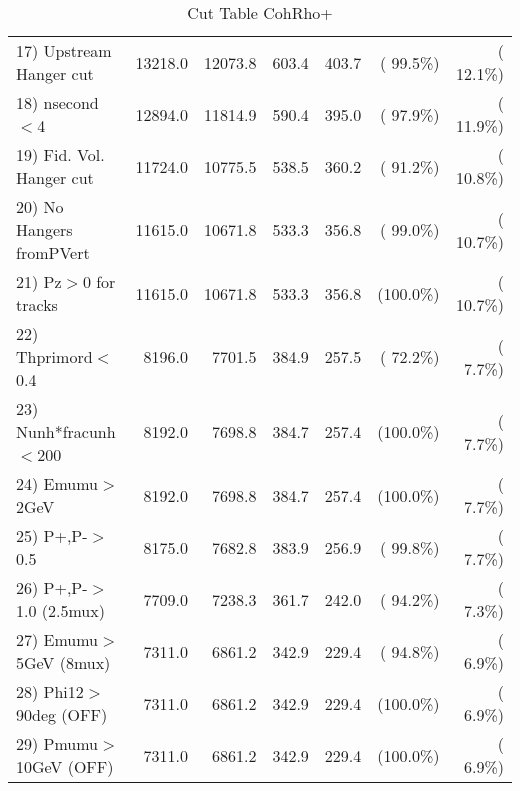 \begin{table}[h!]
\begin{tabular}{||l||r|r|r|r|r|r||}
 17) Upstream Hanger cut  &      13218.0 &      12073.8 &        603.4 &        403.7 & ( 99.5\%) & ( 12.1\%) \\
 18) nsecond$<$4          &      12894.0 &      11814.9 &        590.4 &        395.0 & ( 97.9\%) & ( 11.9\%) \\
 19) Fid. Vol. Hanger cut &      11724.0 &      10775.5 &        538.5 &        360.2 & ( 91.2\%) & ( 10.8\%) \\
 20) No Hangers fromPVert &      11615.0 &      10671.8 &        533.3 &        356.8 & ( 99.0\%) & ( 10.7\%) \\
 21) Pz$>$0 for tracks    &      11615.0 &      10671.8 &        533.3 &        356.8 & (100.0\%) & ( 10.7\%) \\
 22) Thprimord$<$0.4      &       8196.0 &       7701.5 &        384.9 &        257.5 & ( 72.2\%) & (  7.7\%) \\
 23) Nunh*fracunh$<$200   &       8192.0 &       7698.8 &        384.7 &        257.4 & (100.0\%) & (  7.7\%) \\
 24) Emumu$>$2GeV         &       8192.0 &       7698.8 &        384.7 &        257.4 & (100.0\%) & (  7.7\%) \\
 25) P+,P-$>$0.5          &       8175.0 &       7682.8 &        383.9 &        256.9 & ( 99.8\%) & (  7.7\%) \\
 26) P+,P-$>$1.0 (2.5mux) &       7709.0 &       7238.3 &        361.7 &        242.0 & ( 94.2\%) & (  7.3\%) \\
 27) Emumu$>$5GeV  (8mux) &       7311.0 &       6861.2 &        342.9 &        229.4 & ( 94.8\%) & (  6.9\%) \\
 28) Phi12$>$90deg  (OFF) &       7311.0 &       6861.2 &        342.9 &        229.4 & (100.0\%) & (  6.9\%) \\
 29) Pmumu$>$10GeV  (OFF) &       7311.0 &       6861.2 &        342.9 &        229.4 & (100.0\%) & (  6.9\%) \\
 \hline
 \hline
 \end{tabular}
 \caption{Cut Table  CohRho+  }
 \label{tab-cutcohjpsi-mumu_cohrhop}
 \end{table}

